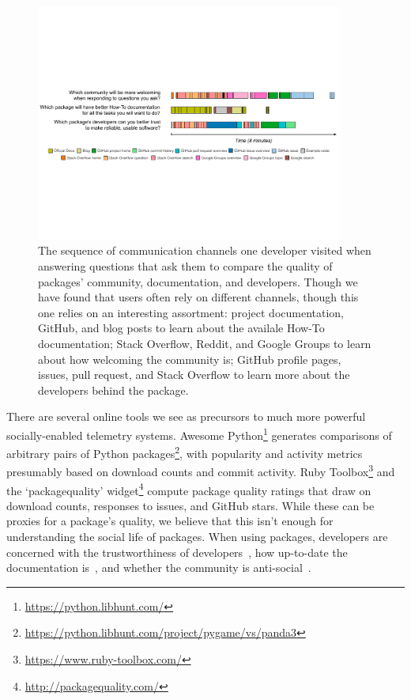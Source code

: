 \begin{figure}
\centering
\includegraphics[width=0.9\textwidth]{figures/visits}
\caption{%
The sequence of communication channels one developer visited when answering questions that ask them to compare the quality of packages' community, documentation, and developers.
Though we have found that users often rely on different channels, though this one relies on an interesting assortment:
project documentation, GitHub, and blog posts to learn about the availale How-To documentation;
Stack Overflow, Reddit, and Google Groups to learn about how welcoming the community is;
GitHub profile pages, issues, pull request, and Stack Overflow to learn more about the developers behind the package.
}
\label{fig:visits}
\end{figure}

There are several online tools we see as precursors to much more powerful socially-enabled telemetry systems.
Awesome Python\footnote{\url{https://python.libhunt.com/}} generates comparisons of arbitrary pairs of Python packages\footnote{\url{https://python.libhunt.com/project/pygame/vs/panda3}}, with popularity and activity metrics presumably based on download counts and commit activity.
Ruby Toolbox\footnote{\url{https://www.ruby-toolbox.com/}} and the `packagequality' widget\footnote{\url{http://packagequality.com/}} compute package quality ratings that draw on download counts, responses to issues, and GitHub stars.
While these can be proxies for a package's quality, we believe that this isn't enough for understanding the social life of packages.
When using packages, developers are concerned with the trustworthiness of developers~\cite{robillard_field_2011}, how up-to-date the documentation is~\cite{storey_revolution_2014,nykaza_what_2002,lethbridge_how_2003,robillard_field_2011}, and whether the community is anti-social~\cite{storey_revolution_2014}.

